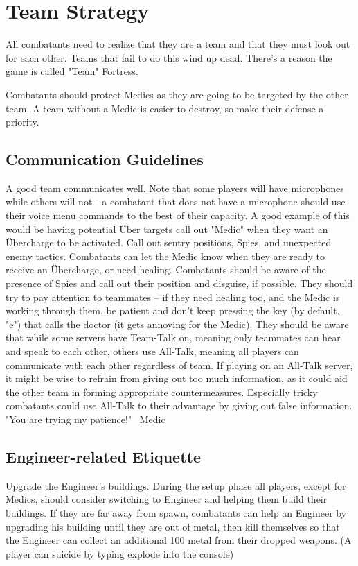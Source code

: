 \section{Team Strategy}
\label{Team_Strategy}
All combatants need to realize that they are a team and that they must look out for each other. Teams that fail to do this wind up dead. There's a reason the game is called "Team" Fortress.

Combatants should protect Medics as they are going to be targeted by the other team. A team without a Medic is easier to destroy, so make their defense a priority.

\subsection{Communication Guidelines}
A good team communicates well. Note that some players will have microphones while others will not - a combatant that does not have a microphone should use their voice menu commands to the best of their capacity. A good example of this would be having potential Über targets call out "Medic" when they want an Übercharge to be activated. Call out sentry positions, Spies, and unexpected enemy tactics.  Combatants can let the Medic know when they are ready to receive an Übercharge, or need healing. Combatants should be aware of the presence of Spies and call out their position and disguise, if possible. They should try to pay attention to teammates -- if they need healing too, and the Medic is working through them, be patient and don't keep pressing the key (by default, "e") that calls the doctor (it gets annoying for the Medic).  They should be aware that while some servers have Team-Talk on, meaning only teammates can hear and speak to each other, others use All-Talk, meaning all players can communicate with each other regardless of team.  If playing on an All-Talk server, it might be wise to refrain from giving out too much information, as it could aid the other team in forming appropriate countermeasures.  Especially tricky combatants could use All-Talk to their advantage by giving out false information.
"You are trying my patience!" ~Medic

\subsection{Engineer-related Etiquette}
Upgrade the Engineer's buildings.  During the setup phase all players, except for Medics, should consider switching to Engineer and helping them build their buildings. If they are far away from spawn, combatants can help an Engineer by upgrading his building until they are out of metal, then kill
themselves so that the Engineer can collect an additional 100 metal from their dropped weapons. (A player can suicide by typing explode into the console)

